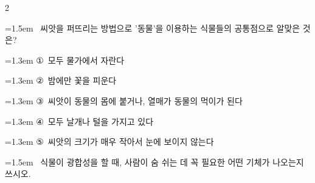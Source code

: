 \documentclass[11pt, a4paper]{article}
\begin{document}
\begin{multicols}{2}
\begin{minipage}{\columnwidth}
\vspace{4mm}
\end{minipage}
\par

\noindent\begin{minipage}{\columnwidth}
\vspace{2mm}
{\hangindent=1.5em  ~씨앗을 퍼뜨리는 방법으로 '동물'을 이용하는 식물들의 공통점으로 알맞은 것은?\par}

\vspace{0.5mm}
{\hangindent=1.3em  \noindent\hspace{0.3em}①~모두 물가에서 자란다\par}
{\hangindent=1.3em  \noindent\hspace{0.3em}②~밤에만 꽃을 피운다\par}
{\hangindent=1.3em  \noindent\hspace{0.3em}③~씨앗이 동물의 몸에 붙거나, 열매가 동물의 먹이가 된다\par}
{\hangindent=1.3em  \noindent\hspace{0.3em}④~모두 날개나 털을 가지고 있다\par}
{\hangindent=1.3em  \noindent\hspace{0.3em}⑤~씨앗의 크기가 매우 작아서 눈에 보이지 않는다\par}
\vspace{4mm}
\end{minipage}
\par

\noindent\begin{minipage}{\columnwidth}
\vspace{2mm}
{\hangindent=1.5em  ~식물이 광합성을 할 때, 사람이 숨 쉬는 데 꼭 필요한 어떤 기체가 나오는지 쓰시오.\par}

\vspace{3mm}
\noindent\hrulefill
\vspace{2.5mm}
\noindent\hrulefill
\vspace{2.5mm}
\noindent\hrulefill
\vspace{2.5mm}
\noindent\hrulefill
\vspace{2.5mm}
\noindent\hrulefill
\vspace{2.5mm}
\vspace{1mm}
\vspace{4mm}
\end{minipage}
\par


\end{multicols}
\end{document}
